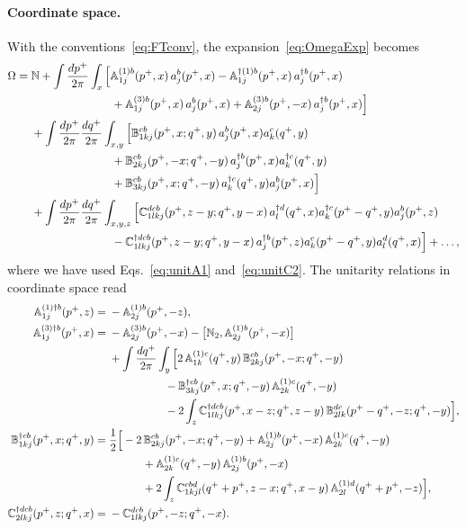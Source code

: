 \paragraph*{Coordinate space.} With the conventions~\eqref{eq:FTconv}, the expansion~\eqref{eq:OmegaExp} becomes
\begin{align}
\Omega={}&\mathbb{N}+\int\frac{dp^+}{2\pi}\int_x\Big[\mathbb{A}^{(1)b}_{1j}(p^+,x)\,a^b_j(p^+,x)-\mathbb{A}^{\dagger(1)b}_{1j}(p^+,x)\,a^{\dagger b}_j(p^+,x)\notag\\
&\hspace{7em}+\mathbb{A}^{(3)b}_{1j}(p^+,x)\,a^b_j(p^+,x)+\mathbb{A}^{(3)b}_{2j}(p^+,-x)\,a^{\dagger b}_j(p^+,x)\Big]\notag\\
&+\int\frac{dp^+}{2\pi}\frac{dq^+}{2\pi}\int_{x,y}\Big[\mathbb{B}^{cb}_{1kj}(p^+,x;q^+,y)\,a^b_j(p^+,x)a^c_k(q^+,y)\notag\\
&\hspace{7em}+\mathbb{B}^{cb}_{2kj}(p^+,-x;q^+,-y)\,a^{\dagger b}_j(p^+,x)a^{\dagger c}_k(q^+,y)\notag\\
&\hspace{7em}+\mathbb{B}^{cb}_{3kj}(p^+,x;q^+,-y)\,a^{\dagger c}_k(q^+,y)a^b_j(p^+,x)\Big]\notag\\
&+\int\frac{dp^+}{2\pi}\frac{dq^+}{2\pi}\int_{x,y,z}\Big[\mathbb{C}^{dcb}_{1lkj}(p^+,z-y;q^+,y-x)\,a^{\dagger d}_l(q^+,x)a^{\dagger c}_k(p^+-q^+,y)a^b_j(p^+,z)\notag\\
&\hspace{7em}-\mathbb{C}^{\dagger dcb}_{1lkj}(p^+,z-y;q^+,y-x)\,a^{\dagger b}_j(p^+,z)a^c_k(p^+-q^+,y)a^d_l(q^+,x)\Big]+\dots,
\label{eq:OmegaX}
\end{align}
where we have used Eqs.~\eqref{eq:unitA1} and~\eqref{eq:unitC2}. The unitarity relations in coordinate space read
\begin{align}
\mathbb{A}^{(1)\dagger b}_{1j}(p^+,z)={}&-\mathbb{A}^{(1)b}_{2j}(p^+,-z),\label{eq:unitA1X}\\
\mathbb{A}^{(3)\dagger b}_{1j}(p^+,x)={}&-\mathbb{A}^{(3)b}_{2j}(p^+,-x)-\big[\mathbb{N}_2,\mathbb{A}^{(1)b}_{2j}(p^+,-x)\big]\notag\\
&+\int\frac{dq^+}{2\pi}\int_y\Big[2\,\mathbb{A}^{(1)c}_{1k}(q^+,y)\,\mathbb{B}^{cb}_{2kj}(p^+,-x;q^+,-y)\notag\\
&\hspace{5em}-\mathbb{B}^{\dagger cb}_{3kj}(p^+,x;q^+,-y)\,\mathbb{A}^{(1)c}_{2k}(q^+,-y)\notag\\
&\hspace{5em}-2\int_z\mathbb{C}^{\dagger dcb}_{1lkj}(p^+,x-z;q^+,z-y)\,\mathbb{B}^{dc}_{2lk}(p^+-q^+,-z;q^+,-y)\Big],\label{eq:unitA3X}\\
\mathbb{B}^{\dagger cb}_{1kj}(p^+,x;q^+,y)={}&\frac12\Big[-2\,\mathbb{B}^{cb}_{2kj}(p^+,-x;q^+,-y)+\mathbb{A}^{(1)b}_{2j}(p^+,-x)\,\mathbb{A}^{(1)c}_{2k}(q^+,-y)\notag\\
&\hspace{3em}+\mathbb{A}^{(1)c}_{2k}(q^+,-y)\,\mathbb{A}^{(1)b}_{2j}(p^+,-x)\notag\\
&\hspace{3em}+2\int_z\mathbb{C}^{cbd}_{1kjl}(q^++p^+,z-x;q^+,x-y)\,\mathbb{A}^{(1)d}_{2l}(q^++p^+,-z)\Big],\label{eq:unitB1X}\\
\mathbb{C}^{\dagger dcb}_{2lkj}(p^+,z;q^+,x)={}&-\mathbb{C}^{dcb}_{1lkj}(p^+,-z;q^+,-x).\label{eq:unitC2X}
\end{align}

